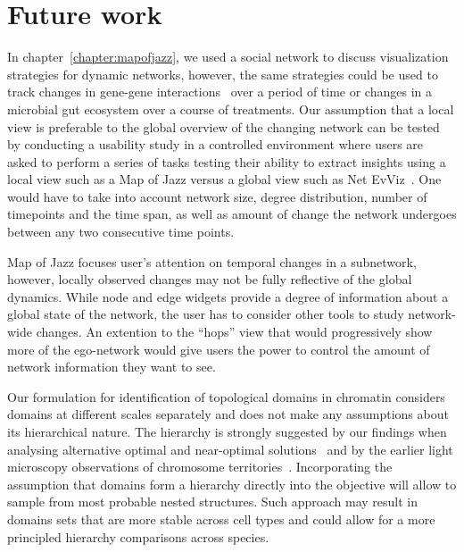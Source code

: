 \documentclass[12pt]{cmuthesis}
\begin{document}





\section{Future work}

In chapter~\ref{chapter:mapofjazz}, we used a social network to discuss visualization strategies for dynamic networks, however, the same strategies could be used to track changes in gene-gene interactions~\cite{GeneKnockouts} over a period of time or changes in a microbial gut ecosystem over a course of treatments. Our assumption that a local view is preferable to the global overview of the changing network can be tested by conducting a usability study in a controlled environment where users are asked to perform a series of tasks testing their ability to extract insights using a local view such as a Map of Jazz versus a global view such as Net EvViz~\cite{Khurana2011}. One would have to take into account network size, degree distribution, number of timepoints and the time span, as well as amount of change the network undergoes between any two consecutive time points.

Map of Jazz focuses user's attention on temporal changes in a subnetwork, however, locally observed changes may not be fully reflective of the global dynamics. While node and edge widgets provide a degree of information about a global state of the network, the user has to consider other tools to study network-wide changes. An extention to the ``hops'' view that would progressively show more of the ego-network would give users the power to control the amount of network information they want to see.

Our formulation for identification of topological domains in chromatin considers domains at different scales separately and does not make any assumptions about its hierarchical nature. The hierarchy is strongly suggested by our findings when analysing alternative optimal and near-optimal solutions~\cite{ArmatusAMB} and by the earlier light microscopy observations of chromosome territories~\cite{Cremer2010}. Incorporating the assumption that domains form a hierarchy directly into the objective will allow to sample from most probable nested structures. Such approach may result in domains sets that are more stable across cell types and could allow for a more principled hierarchy comparisons across species.
\end{document}

